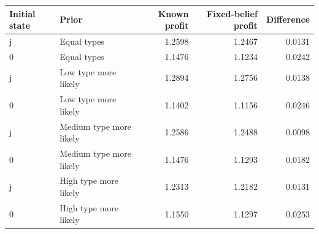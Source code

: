 \begin{tabular}{llrrr}\hline
Initial state & Prior & Known profit & Fixed-belief profit & Difference\\\hline
j & Equal types & 1.2598 & 1.2467 & 0.0131 \\
0 & Equal types & 1.1476 & 1.1234 & 0.0242 \\
j & Low type more likely & 1.2894 & 1.2756 & 0.0138 \\
0 & Low type more likely & 1.1402 & 1.1156 & 0.0246 \\
j & Medium type more likely & 1.2586 & 1.2488 & 0.0098 \\
0 & Medium type more likely & 1.1476 & 1.1293 & 0.0182 \\
j & High type more likely & 1.2313 & 1.2182 & 0.0131 \\
0 & High type more likely & 1.1550 & 1.1297 & 0.0253 \\
\hline\end{tabular}
